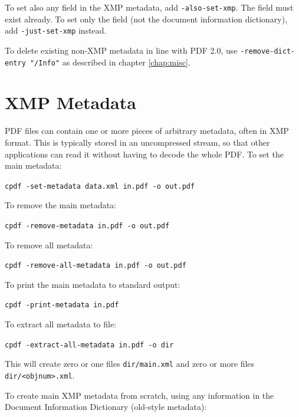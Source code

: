 \documentclass{book}
\begin{document}
To set also any field in the XMP metadata, add \texttt{-also-set-xmp}. The field must exist already. To set only the field (not the document information dictionary), add \texttt{-just-set-xmp} instead.

To delete existing non-XMP metadata in line with PDF 2.0, use \texttt{-remove-dict-entry "/Info"} as described in chapter \ref{chap:misc}.

  \section{XMP Metadata}
  PDF files can contain one or more pieces of arbitrary metadata, often in XMP format.
This is typically stored in an uncompressed stream, so that other applications
can read it without having to decode the whole PDF. To set the main metadata:

  \begin{framed}
    \noindent\small\verb!cpdf -set-metadata data.xml in.pdf -o out.pdf!
  \end{framed}

  \noindent To remove the main metadata:

  \begin{framed}
    \noindent\small\verb!cpdf -remove-metadata in.pdf -o out.pdf!
  \end{framed}

  \noindent To remove all metadata:

  \begin{framed}
    \noindent\small\verb!cpdf -remove-all-metadata in.pdf -o out.pdf!
  \end{framed}

  \noindent To print the main metadata to standard output:

  \begin{framed}
    \noindent\small\verb!cpdf -print-metadata in.pdf!
  \end{framed}

  \noindent To extract all metadata to file:

  \begin{framed}
    \noindent\small\verb!cpdf -extract-all-metadata in.pdf -o dir!
  \end{framed}

  \noindent This will create zero or one files \texttt{dir/main.xml} and zero or more files \texttt{dir/<objnum>.xml}.

  To create main XMP metadata from scratch, using any information in the Document Information Dictionary (old-style metadata):
\end{document}
